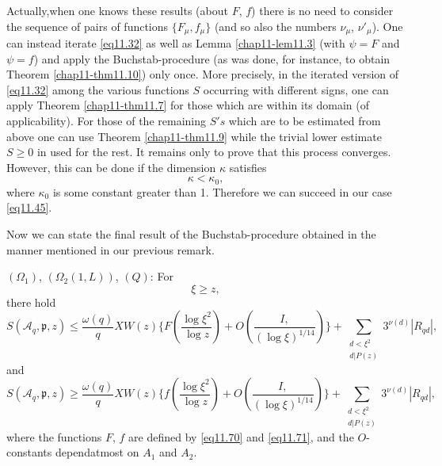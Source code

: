 Actually,\pageoriginale when one knows these results (about $F$, $f$)
there is no need to consider the sequence of pairs of functions $\{
F_\mu , f_\mu\}$ (and so also  the numbers $ \nu_\mu$, $\nu '_\mu $). One
can instead iterate \eqref{eq11.32} as well as Lemma
\ref{chap11-lem11.3} (with $\psi=F$ 
and $\psi =f$) and apply the Buchstab-procedure (as was done, for
instance, to obtain Theorem \ref{chap11-thm11.10}) only once. More
precisely, in the 
iterated version of \eqref{eq11.32} among the various functions $S$
occurring with different signs, one can apply Theorem
\ref{chap11-thm11.7} for those 
which are within its domain (of applicability). For those of the
remaining $S's$ which are to  be  estimated from above one can use
Theorem \ref{chap11-thm11.9} while the trivial lower estimate $S \ge
0$ in used for 
the rest. It remains only to prove that this process converges.
However, this can be done if the dimension $\kappa$ satisfies 
 \begin{equation*}
\kappa < \kappa_0, \tag{11.77}\label{eq11.77}
\end{equation*} 
where $\kappa_0$ is some constant greater than 1. Therefore we can
succeed in our case \eqref{eq11.45}. 
  
 Now we can state the final result of the Buchstab-procedure obtained
 in the manner mentioned in our previous remark. 
 
\begin{theorem}\label{chap11-thm11.12}
$(\Omega_1)$, $(\Omega_2 (1,L))$, $(Q)$: For
 \begin{equation*}
\xi \ge z,\tag{11.78}\label{eq11.78}
 \end{equation*} 
 there hold
\begin{equation*}
S(\mathscr {A}_q,\mathfrak{p},z) \leq \frac{\omega(q)}{q} X W (z)
\bigg\{ F (\frac{\log \xi ^2}{\log z})+ O(\frac{I,}{(\log \xi )
  ^{1/14}})\bigg\}+ \sum_{\substack {d< \xi ^2\\d|P(z)}} 3
^{\nu(d)}|R_{qd}|, \tag{11.79}\label{eq11.79} 
\end{equation*} 
and 
\begin{equation*}
S(\mathscr {A}_q,\mathfrak{p},z) \ge \frac{\omega(q)}{q} X W (z)
\bigg\{ f (\frac{\log \xi ^2}{\log z})+ O(\frac{I,}{(\log \xi )
  ^{1/14}})\bigg\}+ \sum_{\substack {d< \xi ^2\\d|P(z)}} 3
^{\nu(d)}|R_{qd}|,\tag{11.80}\label{eq11.80} 
 \end{equation*} 
where the functions $F$, $f$ are defined by \eqref{eq11.70} and
\eqref{eq11.71}, and the $O$-constants 
depend\pageoriginale atmost on $A_1$ and $A_2$.
\end{theorem}

